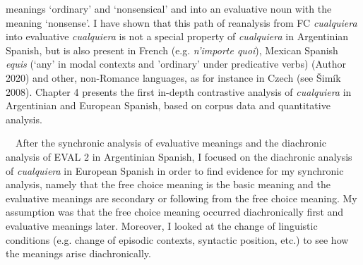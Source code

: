 \begin{styleStandard}
meanings ‘ordinary’ and ‘nonsensical’ and into an evaluative noun with the meaning ‘nonsense’. I have shown that this path of reanalysis from FC \textit{cualquiera} into evaluative \textit{cualquiera }is not a special property of \textit{cualquiera} in Argentinian Spanish, but is also present in French (e.g. \textit{n’importe quoi}), Mexican Spanish \textit{equis} (‘any’ in modal contexts and ’ordinary’ under predicative verbs) (Author 2020) and other, non-Romance languages, as for instance in Czech (see Šimík 2008). Chapter 4 presents the first in-depth contrastive analysis of \textit{cualquiera} in Argentinian and European Spanish, based on corpus data and quantitative analysis. 
\end{styleStandard}

\begin{styleStandard}
\ \ After the synchronic analysis of evaluative meanings and the diachronic analysis of EVAL 2 in Argentinian Spanish, I focused on the diachronic analysis of \textit{cualquiera} in European Spanish in order to find evidence for my synchronic analysis, namely that the free choice meaning is the basic meaning and the evaluative meanings are secondary or following from the free choice meaning. My assumption was that the free choice meaning occurred diachronically first and evaluative meanings later. Moreover, I looked at the change of linguistic conditions (e.g. change of episodic contexts, syntactic position, etc.) to see how the meanings arise diachronically. 
\end{styleStandard}

